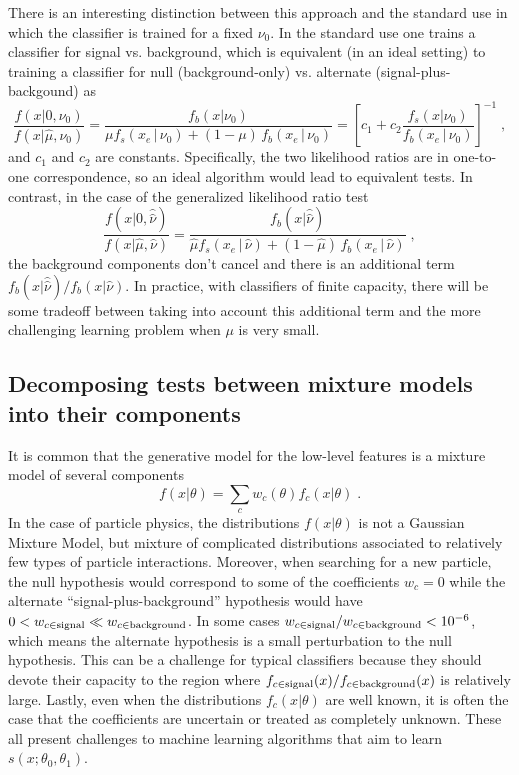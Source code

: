 \documentclass[11pt, oneside]{article}   	%
\begin{document}
There is an interesting distinction between this approach and the standard use in which the classifier is trained for a fixed $\nu_0$. In the standard use one trains a classifier for signal vs. background, which is equivalent (in an ideal setting) to training a classifier for  null (background-only) vs. alternate (signal-plus-backgound) as 
\begin{equation}
 \frac{f(x| 0, \nu_0)}{f(x|\hat \mu, \nu_0)} =  \frac{f_b(x| \nu_0)}{ \mu f_s( x_e \, |\,  \nu_0)  + (1-\mu)\, f_b( x_e \,|\, \nu_0)} = \left[ c_1 + c_2   \frac{f_s(x| \nu_0)}{ f_b( x_e \,|\, \nu_0)} \right ]^{-1} \; ,
\end{equation}
and $c_1$ and $c_2$ are constants. Specifically, the two  likelihood ratios are in one-to-one correspondence, so an ideal algorithm would lead to equivalent tests. In contrast, in the case of the generalized likelihood ratio test 
\begin{equation}
 \frac{f(x| 0, \hat{\hat{ \nu}})}{f(x|\hat \mu, \hat\nu)} =  \frac{f_b(x| \hat{\hat{ \nu}})}{ \hat \mu f_s( x_e \, |\,  \hat\nu)  + (1- \hat \mu )\, f_b( x_e \,|\, \hat \nu)} \; ,
\end{equation}
the background components don't cancel and there is an additional term $f_b(x| \hat{\hat{ \nu}})/f_b(x| {\hat{ \nu}})$.
In practice, with classifiers of finite capacity, there will be some tradeoff between taking into account this additional term and the more challenging learning problem when $\mu$ is very small. 

\subsection{Decomposing tests between mixture models into their components}

It is common that the generative model for the low-level features is a mixture model of several components
\begin{equation}
f(x|\theta)=\sum_c w_c(\theta) f_c(x| \theta) \;.
\end{equation}
In the case of particle physics, the distributions $f(x|\theta)$ is not a Gaussian Mixture Model, but mixture of  complicated distributions associated to relatively few types of particle interactions. Moreover, when searching for a new particle, the null hypothesis would correspond to some of the coefficients $w_c=0$ while the alternate ``signal-plus-background'' hypothesis would have $0<w_{c\in \rm signal} \ll w_{c\in \rm background}$. In some cases $w_{c\in \rm signal} / w_{c\in \rm background} <10^{-6}$, which means the alternate hypothesis is a small perturbation to the null hypothesis. This can be a challenge for typical classifiers because they should devote their capacity to the region where $f_{c\in \rm signal}(x) / f_{c\in \rm background}(x)$ is relatively large. Lastly, even when the distributions $f_c(x|\theta)$ are well known, it is often the case that the coefficients are uncertain or treated as completely unknown. These all present challenges to machine learning algorithms that aim to learn $s(x; \theta_0, \theta_1)$.
\end{document}
